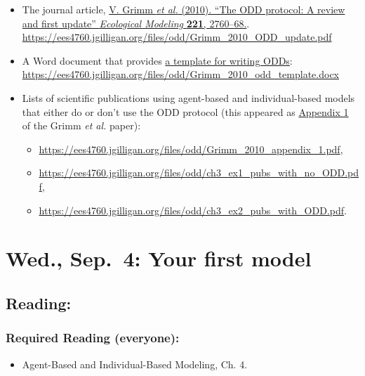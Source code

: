 \documentclass[
]{article}
\providecommand{\tightlist}{%
  \setlength{\itemsep}{0pt}\setlength{\parskip}{0pt}}
\begin{document}
\begin{itemize}
\tightlist
\item
  The journal article, \href{/files/odd/Grimm_2010_ODD_update.pdf}{V.
  Grimm \emph{et al.} (2010). ``The ODD protocol: A review and first
  update'' \emph{Ecological Modeling} \textbf{221}, 2760--68.}.
  \url{https://ees4760.jgilligan.org/files/odd/Grimm_2010_ODD_update.pdf}
\item
  A Word document that provides
  \href{/files/odd/Grimm_2010_odd_template.docx}{a template for writing
  ODDs}:
  \url{https://ees4760.jgilligan.org/files/odd/Grimm_2010_odd_template.docx}
\item
  Lists of scientific publications using agent-based and
  individual-based models that either do or don't use the ODD protocol
  (this appeared as \href{/files/odd/Grimm_2010_appendix_1.pdf}{Appendix
  1} of the Grimm \emph{et al.} paper):

  \begin{itemize}
  \tightlist
  \item
    \url{https://ees4760.jgilligan.org/files/odd/Grimm_2010_appendix_1.pdf},
  \item
    \url{https://ees4760.jgilligan.org/files/odd/ch3_ex1_pubs_with_no_ODD.pdf},
  \item
    \url{https://ees4760.jgilligan.org/files/odd/ch3_ex2_pubs_with_ODD.pdf}.
  \end{itemize}
\end{itemize}

\section{Wed., Sep.~4: Your first
model}\label{wed.-sep.-4-your-first-model}

\subsection{Reading:}\label{reading-4}

\subsubsection{Required Reading
(everyone):}\label{required-reading-everyone-3}

\begin{itemize}
\tightlist
\item
  Agent-Based and Individual-Based Modeling, Ch. 4.
\end{itemize}
\end{document}
